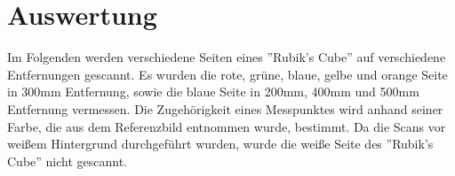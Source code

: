 \documentclass[ngerman,a4paper,parskip=half]{scrartcl}
\begin{document}


\section{Auswertung}
\label{sec:evaluation}

Im Folgenden werden verschiedene Seiten eines ''Rubik's Cube'' auf verschiedene Entfernungen gescannt. Es wurden die rote, grüne, blaue, gelbe und orange Seite in 300mm Entfernung, sowie die blaue Seite in 200mm, 400mm und 500mm Entfernung vermessen. Die Zugehörigkeit eines Messpunktes wird anhand seiner Farbe, die aus dem Referenzbild entnommen wurde, bestimmt. Da die Scans vor weißem Hintergrund durchgeführt wurden, wurde die weiße Seite des ''Rubik's Cube'' nicht gescannt.
\end{document}
